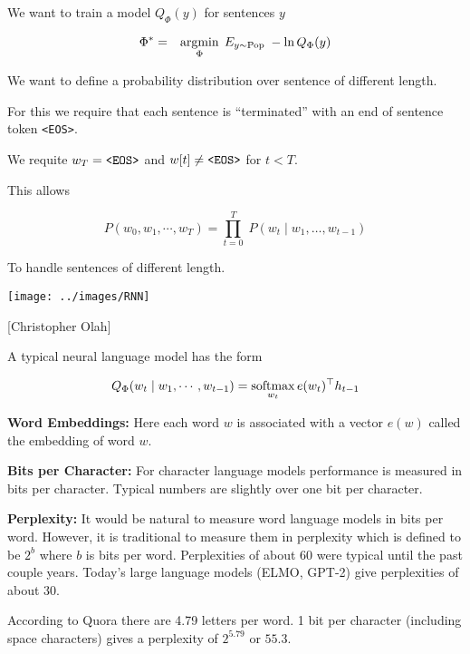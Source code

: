 {\vfill
We want to train a model $Q_\Phi(y)$ for sentences $y$

\begin{eqnarray*}
\Phi^* & = & \operatorname*{argmin}_\Phi \; E_{y \sim \mathrm{Pop}}\;-\ln Q_\Phi(y)
\end{eqnarray*}


We want to define a probability distribution over sentence of different length.

\vfill
For this we require that each sentence is ``terminated'' with an end of sentence token {\tt <EOS>}.

\vfill
We requite $w_T = \mbox{\tt <EOS>}$ and $w[t] \not = \mbox{\tt <EOS>}$ for $t < T$.

\vfill
This allows

$$P(w_0, w_1, \cdots, w_T) = \prod_{t=0}^T\;P(w_t\;|\;w_1,\ldots,w_{t-1})$$

To handle sentences of different length.





\centerline{\texttt{[image: ../images/RNN]}}
\centerline{{\large [Christopher Olah]}}

A typical neural language model has the form

$$Q_\Phi(w_t\;|\;w_1,\cdots,w_{t-1}) = \operatorname*{softmax}_{w_t} e(w_t)^\top h_{t-1}$$

\vfill
{\bf Word Embeddings:} Here each word $w$ is associated with a vector $e(w)$ called the embedding of word $w$.



{\bf Bits per Character:}
For character language models performance is measured in bits per character.  Typical numbers are slightly over one bit per character.

\vfill
{\bf Perplexity:}
It would be natural to measure word language models in bits per word.  However, it is traditional to measure them in perplexity which is defined to be
$2^b$ where $b$ is bits per word.  Perplexities of about 60 were typical until the past couple years.  Today's large language models (ELMO, GPT-2) give
perplexities of about 30.

\vfill
According to Quora there are 4.79 letters per word.  1 bit per character (including space characters) gives a perplexity of $2^{5.79}$ or $55.3$.

\slide{}

}
